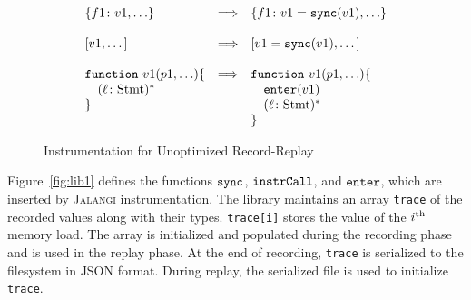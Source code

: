 \documentclass{sig-alternate}
\def\jalangi{\textsc{Jalangi}}
\newcommand \dsl [1] {\ensuremath{{\tt #1}}\xspace}
\newcommand \Sync{\dsl{sync}}
\newcommand \Enter{\dsl{enter}}
\newcommand \Exit{\dsl{exit}}
\begin{document}
\begin{figure}
{\[\begin{array}{lrl}
  \{f1\colon v1, \ldots\} & \Longrightarrow &\{f1\colon v1 = \Sync(v1), \ldots\} \\
& & \\
  \mbox{[}v1, \ldots\mbox{]} & \Longrightarrow & \mbox{[}v1 = \Sync(v1), \ldots\mbox{]} \\
& & \\
    \dsl{function}\ v1(p1, \ldots) \{ & \Longrightarrow &  \dsl{function}\ v1 (p1, \ldots) \{\\
\quad (\ell\colon \mbox{Stmt})^* & & \quad \Enter(v1)\\
\} & & \quad  (\ell\colon \mbox{Stmt})^*\\
& & \}\\
\end{array}
\]}
\caption{Instrumentation for Unoptimized Record-Replay}
\label{fig:instr1}
\end{figure}

Figure~\ref{fig:lib1} defines the functions $\Sync$,
$\dsl{instrCall}$, and $\Enter$, which are inserted by \jalangi{}
instrumentation.  The library maintains an array \texttt{trace} of the
recorded values along with their types.  \texttt{trace[i]} stores the
value of the $i^{\rm th}$ memory load.  The array is initialized and
populated during the recording phase and is used in the replay phase.
At the end of recording, \texttt{trace} is serialized to the
filesystem in JSON format.  During replay, the serialized file is used
to initialize \texttt{trace}.
\end{document}
